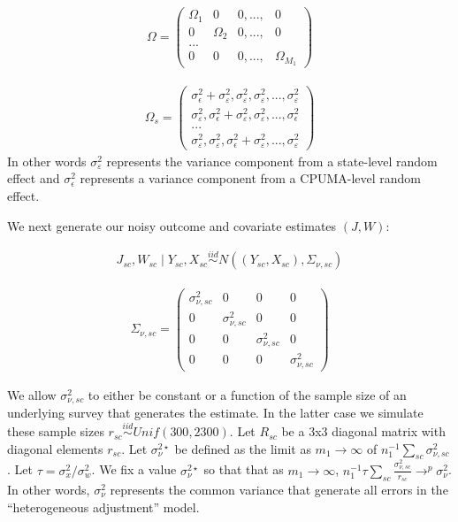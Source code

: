 \begin{align*}
    \Omega = \begin{pmatrix}
    \Omega_1 & 0 & 0, ..., & 0 \\
    0 & \Omega_2 & 0, ..., & 0 \\
    ... \\
    0 & 0 & 0, ..., & \Omega_{M_1} 
    \end{pmatrix}
\end{align*}

\begin{align*}
    \Omega_s = \begin{pmatrix}
    \sigma^2_{\epsilon} + \sigma^2_{\varepsilon}, \sigma^2_{\varepsilon}, \sigma^2_{\varepsilon}, ..., \sigma^2_{\varepsilon} \\
    \sigma^2_{\varepsilon}, \sigma^2_{\epsilon} + \sigma^2_{\varepsilon}, \sigma^2_{\varepsilon}, ..., \sigma^2_{\epsilon} \\
    ... \\
    \sigma^2_{\varepsilon}, \sigma^2_{\varepsilon}, \sigma^2_{\epsilon} + \sigma^2_{\varepsilon}, ..., \sigma^2_{\varepsilon}
    \end{pmatrix}
\end{align*}
%
In other words $\sigma^2_{\varepsilon}$ represents the variance component from a state-level random effect and $\sigma^2_{\epsilon}$ represents a variance component from a CPUMA-level random effect.

We next generate our noisy outcome and covariate estimates $(J, W)$:

\begin{align*}
J_{sc}, W_{sc} \mid Y_{sc}, X_{sc} \stackrel{iid}\sim N((Y_{sc}, X_{sc}), \Sigma_{\nu, sc})
\end{align*}

\begin{align*}
    \Sigma_{\nu, sc} = \begin{pmatrix}
    \sigma^2_{\nu, sc} & 0 & 0 & 0 \\
    0 & \sigma^2_{\nu, sc} & 0 & 0 \\
    0 & 0 & \sigma^2_{\nu, sc} & 0 \\
    0 & 0 & 0 & \sigma^2_{\nu, sc}
    \end{pmatrix}
\end{align*}

We allow $\sigma^2_{\nu, sc}$ to either be constant or a function of the sample size of an underlying survey that generates the estimate. In the latter case we simulate these sample sizes $r_{sc} \stackrel{iid}\sim Unif(300, 2300)$. Let $R_{sc}$ be a 3x3 diagonal matrix with diagonal elements $r_{sc}$. Let $\sigma_{\nu}^{2\star}$ be defined as the limit as $m_1 \to \infty$ of $n_1^{-1}\sum_{sc}\sigma^2_{\nu, sc}$. Let $\tau = \sigma^2_x/\sigma^2_w$. We fix a value $\sigma_{\nu}^{2\star}$ so that that as $m_1 \to \infty$, $n_1^{-1} \tau \sum_{sc}\frac{\sigma^2_{\nu, sc}}{r_{sc}} \to^p \sigma^2_{\nu}$. In other words, $\sigma_{\nu}^2$ represents the common variance that generate all errors in the ``heterogeneous adjustment'' model. 


